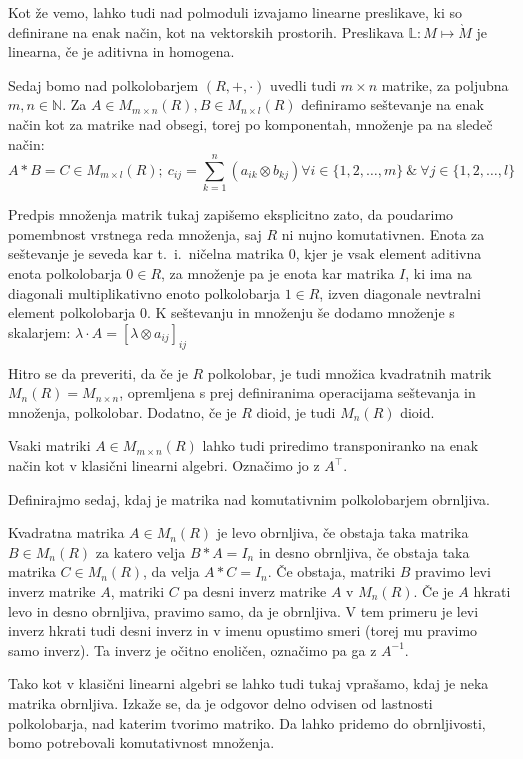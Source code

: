 \documentclass[mat1]{fmfdelo}
\newcommand{\N}{\mathbb{N}}
\begin{document}
Kot že vemo, lahko tudi nad polmoduli izvajamo linearne preslikave, ki so definirane na enak način, kot na vektorskih prostorih. Preslikava $\mathbb{L}: M \mapsto \grave{M}$ je linearna, če je aditivna in homogena.

Sedaj bomo nad polkolobarjem $(R, +, \cdot)$ uvedli tudi $m\times n$ matrike, za poljubna $m,n\in\N$. Za $A\in M_{m\times n}(R), B\in M_{n\times l}(R)$ definiramo seštevanje na enak način kot za matrike nad obsegi, torej po komponentah, množenje pa na sledeč način:
$$ 
	A*B = C \in M_{m\times l}(R);~ c_{ij} = \sum_{k = 1}^{n}(a_{ik}\otimes b_{kj}) \forall i \in \{1, 2, \ldots, m\}~\&~\forall j \in \{1, 2, \ldots, l\}
$$

Predpis množenja matrik tukaj zapišemo eksplicitno zato, da poudarimo pomembnost vrstnega reda množenja, saj $R$ ni nujno komutativnen. Enota za seštevanje je seveda kar t.~i.~ničelna matrika $0$, kjer je vsak element aditivna enota polkolobarja $0\in R$, za množenje pa je enota kar matrika $I$, ki ima na diagonali multiplikativno enoto polkolobarja $1\in R$, izven diagonale nevtralni element polkolobarja $0$. K seštevanju in množenju še dodamo množenje s skalarjem: $\lambda \cdot A = [\lambda \otimes a_{ij}]_{ij}$

Hitro se da preveriti, da če je $R$ polkolobar, je tudi množica kvadratnih matrik $M_n(R) = M_{n\times n}$, opremljena s prej definiranima operacijama seštevanja in množenja, polkolobar. Dodatno, če je $R$ dioid, je tudi $M_n(R)$ dioid.

Vsaki matriki $A\in M_{m\times n}(R)$ lahko tudi priredimo transponiranko na enak način kot v klasični linearni algebri. Označimo jo z $A^{\top}$.

Definirajmo sedaj, kdaj je matrika nad komutativnim polkolobarjem obrnljiva.

\begin{definicija}\label{def:invmatr}
	Kvadratna matrika $A\in M_n(R)$ je levo obrnljiva, če obstaja taka matrika $B\in M_n(R)$ za katero velja $B*A = I_n$ in desno obrnljiva, če obstaja taka matrika $C\in M_n(R)$, da velja $A*C = I_n$. Če obstaja, matriki $B$ pravimo levi inverz matrike $A$, matriki $C$ pa desni inverz matrike $A$ v $M_n(R)$. Če je $A$ hkrati levo in desno obrnljiva, pravimo samo, da je obrnljiva. V tem primeru je levi inverz hkrati tudi desni inverz in v imenu opustimo smeri (torej mu pravimo samo inverz). Ta inverz je očitno enoličen, označimo pa ga z $A^{-1}$.
\end{definicija}

Tako kot v klasični linearni algebri se lahko tudi tukaj vprašamo, kdaj je neka matrika obrnljiva. Izkaže se, da je odgovor delno odvisen od lastnosti polkolobarja, nad katerim tvorimo matriko. Da lahko pridemo do obrnljivosti, bomo potrebovali komutativnost množenja.
\end{document}
